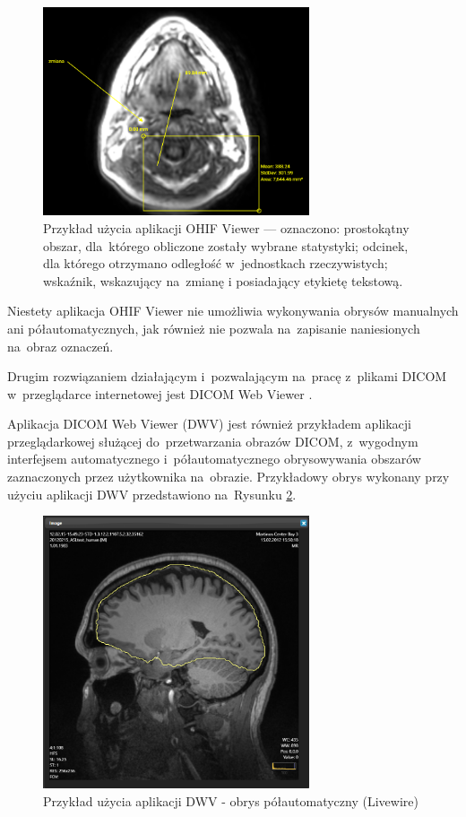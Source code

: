 \documentclass[a4paper,11pt,twoside,openright]{report}
\theoremstyle{definition}
\begin{document}
\begin{figure}[b!]
	\center
	\includegraphics[width=0.7\textwidth]{OHIF-example}
	\caption{Przykład użycia aplikacji OHIF Viewer --- oznaczono: prostokątny obszar,
	dla~którego obliczone zostały wybrane statystyki; odcinek, dla którego otrzymano
	odległość w~jednostkach rzeczywistych; wskaźnik, wskazujący na~zmianę i posiadający
	etykietę tekstową.}
    	\label{fig:OHIF-example}
\end{figure}

Niestety aplikacja OHIF Viewer nie umożliwia wykonywania obrysów manualnych ani półautomatycznych,
jak również nie pozwala na~zapisanie naniesionych na~obraz oznaczeń.

Drugim rozwiązaniem działającym i~pozwalającym na~pracę z~plikami DICOM w~przeglądarce
internetowej jest DICOM Web Viewer \cite{DWV}.

Aplikacja DICOM Web Viewer (DWV) jest również przykładem aplikacji
przeglądarkowej służącej do~przetwarzania obrazów DICOM, z~wygodnym interfejsem
automatycznego i~półautomatycznego obrysowywania obszarów zaznaczonych
przez użytkownika na~obrazie. Przykładowy obrys wykonany przy użyciu aplikacji
DWV przedstawiono na~Rysunku \ref{fig:DWV-interface}.

\begin{figure}[tb!]
	\center
	\includegraphics[width=0.7\textwidth]{DWV-interface}
	\caption{Przykład użycia aplikacji DWV - obrys półautomatyczny (Livewire) \cite{DWV}}
    	\label{fig:DWV-interface}
\end{figure}
\end{document}
